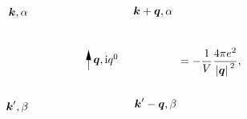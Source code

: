 \begin{equation}
\begin{gathered}
\begin{tikzpicture}[x=0.75pt,y=0.75pt,yscale=-1,xscale=1]
            \draw    (169.09,129.1) -- (169.09,107.04) ;
            \draw [shift={(169.09,105.04)}, rotate = 450] [fill={rgb, 255:red, 0; green, 0; blue, 0 }  ][line width=0.08]  [draw opacity=0] (12,-3) -- (0,0) -- (12,3) -- cycle    ;
            
            \draw (97.72,60.8) node [anchor=east] [inner sep=0.75pt]    {$\boldsymbol{k} ,\alpha $};
            \draw (221.22,59.47) node [anchor=west] [inner sep=0.75pt]    {$\boldsymbol{k} +\boldsymbol{q} ,\alpha $};
            \draw (173.48,108.5) node [anchor=north west][inner sep=0.75pt]    {$\boldsymbol{q}, \ii q^0$};
            \draw (98.17,172.51) node [anchor=east] [inner sep=0.75pt]    {$\boldsymbol{k} ',\beta $};
            \draw (222.46,169.26) node [anchor=west] [inner sep=0.75pt]    {$\boldsymbol{k} '-\boldsymbol{q} ,\beta $};
            \end{tikzpicture}
    \end{gathered} = - \frac{1}{V} \frac{4\pi e^2}{\abs*{\vb*{q}}^2},
    \label{eq:jellium-vertex}
\end{equation}